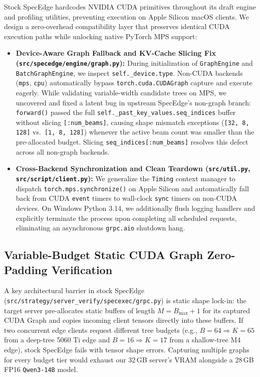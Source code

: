\documentclass[10pt,conference]{IEEEtran}
\begin{document}
Stock SpecEdge hardcodes NVIDIA CUDA primitives throughout its draft engine and profiling utilities, preventing execution on Apple Silicon macOS clients. We design a zero-overhead compatibility layer that preserves identical CUDA execution paths while unlocking native PyTorch MPS support:
\begin{itemize}
  \item \textbf{Device-Aware Graph Fallback and KV-Cache Slicing Fix (\texttt{src/specedge/engine/graph.py}):} During initialization of \texttt{GraphEngine} and \texttt{BatchGraphEngine}, we inspect \texttt{self.\_device.type}. Non-CUDA backends (\texttt{mps}, \texttt{cpu}) automatically bypass \texttt{torch.cuda.CUDAGraph} capture and execute eagerly. While validating variable-width candidate trees on MPS, we uncovered and fixed a latent bug in upstream SpecEdge's non-graph branch: \texttt{forward()} passed the full \texttt{self.\_past\_key\_values.seq\_indices} buffer without slicing \texttt{[:num\_beams]}, causing shape mismatch exceptions (\texttt{[32, 8, 128]} vs.\ \texttt{[1, 8, 128]}) whenever the active beam count was smaller than the pre-allocated budget. Slicing \texttt{seq\_indices[:num\_beams]} resolves this defect across all non-graph backends.
  \item \textbf{Cross-Backend Synchronization and Clean Teardown (\texttt{src/util.py}, \texttt{src/script/client.py}):} We generalize the \texttt{Timing} context manager to dispatch \texttt{torch.mps.synchronize()} on Apple Silicon and automatically fall back from CUDA \texttt{event} timers to wall-clock \texttt{sync} timers on non-CUDA devices. On Windows Python 3.14, we additionally flush logging handlers and explicitly terminate the process upon completing all scheduled requests, eliminating an asynchronous \texttt{grpc.aio} shutdown hang.
\end{itemize}

\subsection{Variable-Budget Static CUDA Graph Zero-Padding Verification}

A key architectural barrier in stock SpecEdge (\texttt{src/strategy/server\_verify/specexec/grpc.py}) is static shape lock-in: the target server pre-allocates static buffers of length $M = B_{\max} + 1$ for its captured CUDA Graph and copies incoming client tensors directly into these buffers. If two concurrent edge clients request different tree budgets (e.g., $B{=}64 \Rightarrow K{=}65$ from a deep-tree 5060 Ti edge and $B{=}16 \Rightarrow K{=}17$ from a shallow-tree M4 edge), stock SpecEdge fails with tensor shape errors. Capturing multiple graphs for every budget tier would exhaust our 32\,GB server's VRAM alongside a 28\,GB FP16 \texttt{Qwen3-14B} model.
\end{document}
